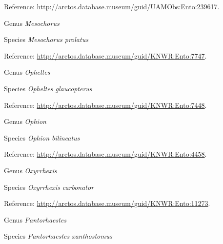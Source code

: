 \documentclass[9pt, article]{memoir}
\begin{document}
\begin{multicols}{2}
\vspace{6pt}Reference: 
\url{http://arctos.database.museum/guid/UAMObs:Ento:239617}.

\vspace{6pt}\noindent\hspace{30pt}Genus \textit{Mesochorus}


\vspace{6pt}\noindent\hspace{36pt}Species \textit{Mesochorus prolatus}


\vspace{6pt}Reference: 
\url{http://arctos.database.museum/guid/KNWR:Ento:7747}.

\vspace{6pt}\noindent\hspace{30pt}Genus \textit{Opheltes}


\vspace{6pt}\noindent\hspace{36pt}Species \textit{Opheltes glaucopterus}


\vspace{6pt}Reference: 
\url{http://arctos.database.museum/guid/KNWR:Ento:7448}.

\vspace{6pt}\noindent\hspace{30pt}Genus \textit{Ophion}


\vspace{6pt}\noindent\hspace{36pt}Species \textit{Ophion bilineatus}


\vspace{6pt}Reference: 
\url{http://arctos.database.museum/guid/KNWR:Ento:4458}.

\vspace{6pt}\noindent\hspace{30pt}Genus \textit{Oxyrrhexis}


\vspace{6pt}\noindent\hspace{36pt}Species \textit{Oxyrrhexis carbonator}


\vspace{6pt}Reference: 
\url{http://arctos.database.museum/guid/KNWR:Ento:11273}.

\vspace{6pt}\noindent\hspace{30pt}Genus \textit{Pantorhaestes}


\vspace{6pt}\noindent\hspace{36pt}Species \textit{Pantorhaestes xanthostomus}



\end{multicols}
\end{document}
